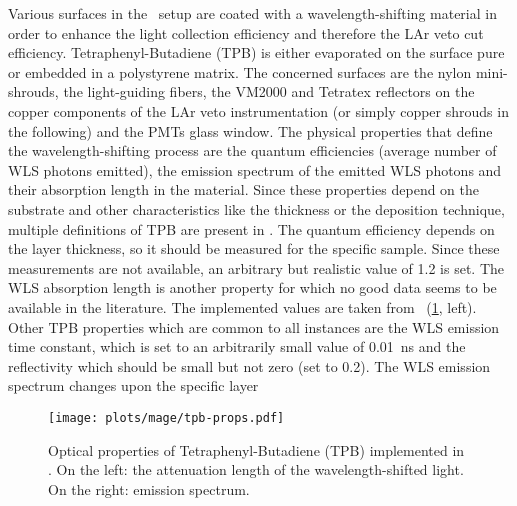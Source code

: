 Various surfaces in the \gerda\ setup are coated with a wavelength-shifting material in
order to enhance the light collection efficiency and therefore the LAr veto cut
efficiency. Tetraphenyl-Butadiene (TPB) is either evaporated on the surface pure or
embedded in a polystyrene matrix. The concerned surfaces are the nylon mini-shrouds, the
light-guiding fibers, the VM2000 and Tetratex\reg{} reflectors on the copper components of
the LAr veto instrumentation (or simply copper shrouds in the following) and the PMTs
glass window. The physical properties that define the wavelength-shifting process are the
quantum efficiencies (average number of WLS photons emitted), the emission spectrum of the
emitted WLS photons and their absorption length in the material. Since these properties
depend on the substrate and other characteristics like the thickness or the deposition
technique, multiple definitions of TPB are present in \mage. The quantum efficiency
depends on the layer thickness, so it should be measured for the specific sample. Since
these measurements are not available, an arbitrary but realistic value of 1.2 is set. The
WLS absorption length is another property for which no good data seems to be available in
the literature. The implemented values are taken from~\cite{Benson2017}
(\cref{fig:bkg:lar:ph2:mage:tpb-props}, left). Other TPB properties which are common to
all instances are the WLS emission time constant, which is set to an arbitrarily small
value of 0.01~ns and the reflectivity which should be small but not zero (set to 0.2).
The WLS emission spectrum changes upon the specific layer

\begin{figure}
  \centering
  \texttt{[image: plots/mage/tpb-props.pdf]}
  \caption{%
    Optical properties of Tetraphenyl-Butadiene (TPB) implemented in \mage. On the
    left: the attenuation length of the wavelength-shifted light. On the right:
    emission spectrum.
  }\label{fig:bkg:lar:ph2:mage:tpb-props}
\end{figure}

